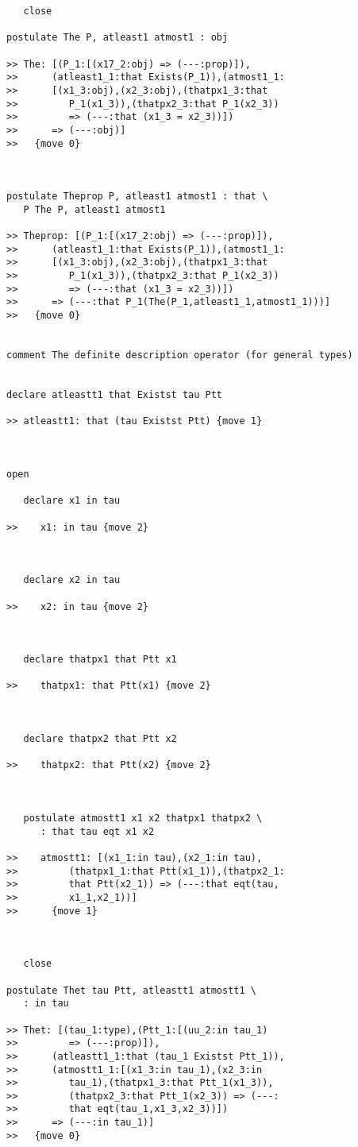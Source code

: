 \documentclass[12pt]{article}
\begin{document}
\begin{verbatim}
   close

postulate The P, atleast1 atmost1 : obj

>> The: [(P_1:[(x17_2:obj) => (---:prop)]),
>>      (atleast1_1:that Exists(P_1)),(atmost1_1:
>>      [(x1_3:obj),(x2_3:obj),(thatpx1_3:that
>>         P_1(x1_3)),(thatpx2_3:that P_1(x2_3))
>>         => (---:that (x1_3 = x2_3))])
>>      => (---:obj)]
>>   {move 0}



postulate Theprop P, atleast1 atmost1 : that \
   P The P, atleast1 atmost1

>> Theprop: [(P_1:[(x17_2:obj) => (---:prop)]),
>>      (atleast1_1:that Exists(P_1)),(atmost1_1:
>>      [(x1_3:obj),(x2_3:obj),(thatpx1_3:that
>>         P_1(x1_3)),(thatpx2_3:that P_1(x2_3))
>>         => (---:that (x1_3 = x2_3))])
>>      => (---:that P_1(The(P_1,atleast1_1,atmost1_1)))]
>>   {move 0}


comment The definite description operator (for general types)


declare atleastt1 that Existst tau Ptt

>> atleastt1: that (tau Existst Ptt) {move 1}



open

   declare x1 in tau

>>    x1: in tau {move 2}



   declare x2 in tau

>>    x2: in tau {move 2}



   declare thatpx1 that Ptt x1

>>    thatpx1: that Ptt(x1) {move 2}



   declare thatpx2 that Ptt x2

>>    thatpx2: that Ptt(x2) {move 2}



   postulate atmostt1 x1 x2 thatpx1 thatpx2 \
      : that tau eqt x1 x2

>>    atmostt1: [(x1_1:in tau),(x2_1:in tau),
>>         (thatpx1_1:that Ptt(x1_1)),(thatpx2_1:
>>         that Ptt(x2_1)) => (---:that eqt(tau,
>>         x1_1,x2_1))]
>>      {move 1}



   close

postulate Thet tau Ptt, atleastt1 atmostt1 \
   : in tau

>> Thet: [(tau_1:type),(Ptt_1:[(uu_2:in tau_1)
>>         => (---:prop)]),
>>      (atleastt1_1:that (tau_1 Existst Ptt_1)),
>>      (atmostt1_1:[(x1_3:in tau_1),(x2_3:in
>>         tau_1),(thatpx1_3:that Ptt_1(x1_3)),
>>         (thatpx2_3:that Ptt_1(x2_3)) => (---:
>>         that eqt(tau_1,x1_3,x2_3))])
>>      => (---:in tau_1)]
>>   {move 0}




\end{verbatim}
\end{document}

